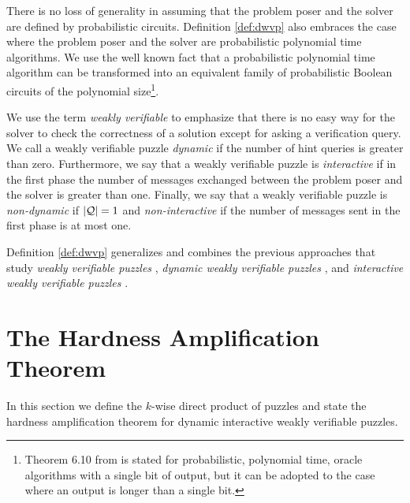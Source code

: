 There is no loss of generality in assuming that the problem poser and the solver are defined by probabilistic circuits.
Definition \ref{def:dwvp} also embraces the case where the problem poser and the solver are probabilistic polynomial time algorithms.
We use the well known fact \cite{LectureNotesCT} that a probabilistic polynomial time algorithm can be transformed into an equivalent
family of probabilistic Boolean circuits of the polynomial size\footnote{Theorem 6.10 from \cite{LectureNotesCT} is stated for probabilistic, polynomial time,
oracle algorithms with a single bit of output, but it can be adopted to the case where an output is longer than a single bit.}.

We use the term \textit{weakly verifiable} to emphasize that there is no easy way
for the solver to check the correctness of a solution except for asking a verification query.
We call a weakly verifiable puzzle \textit{dynamic} if the number of hint queries is greater than zero.
Furthermore, we say that a weakly verifiable puzzle is \textit{interactive} if in the first
phase the number of messages exchanged between the problem poser and the solver is greater than one.
Finally, we say that a weakly verifiable puzzle is \textit{non-dynamic} if $|\mathcal{Q}| = 1$
and \textit{non-interactive} if the number of messages sent in the first phase is at most one.

Definition \ref{def:dwvp} generalizes and combines the previous approaches that study
\textit{weakly verifiable puzzles} \cite{canetti2005hardness},
\textit{dynamic weakly verifiable puzzles} \cite{dodis2009security}, and \textit{interactive weakly verifiable puzzles} \cite{holenstein2011general}.

%
\section{The Hardness Amplification Theorem}
\label{section:hardness_amplification_diwvp}
In this section we define the $k$-wise direct product of puzzles and state the hardness amplification theorem for dynamic interactive weakly verifiable puzzles.

